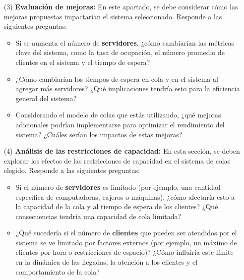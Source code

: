 \documentclass{article}
\begin{document}
\begin{problem}
\begin{itemize}
    \item [(3)] \textbf{Evaluación de mejoras:}
    En este apartado, se debe considerar cómo las mejoras propuestas impactarían el sistema seleccionado. Responde a las siguientes preguntas:
    \begin{itemize}
        \item Si se aumenta el número de \textbf{servidores}, ¿cómo cambiarían las métricas clave del sistema, como la tasa de ocupación, el número promedio de clientes en el sistema y el tiempo de espera?
        \item ¿Cómo cambiarían los tiempos de espera en cola y en el sistema al agregar más servidores? ¿Qué implicaciones tendría esto para la eficiencia general del sistema?
        \item Considerando el modelo de colas que estás utilizando, ¿qué mejoras adicionales podrían implementarse para optimizar el rendimiento del sistema? ¿Cuáles serían los impactos de estas mejoras?
    \end{itemize}
    
    \item [(4)] \textbf{Análisis de las restricciones de capacidad:}
    En esta sección, se deben explorar los efectos de las restricciones de capacidad en el sistema de colas elegido. Responde a las siguientes preguntas:
    \begin{itemize}
        \item Si el número de \textbf{servidores} es limitado (por ejemplo, una cantidad específica de computadoras, cajeros o máquinas), ¿cómo afectaría esto a la capacidad de la cola y al tiempo de espera de los clientes? ¿Qué consecuencias tendría una capacidad de cola limitada?
        \item ¿Qué sucedería si el número de \textbf{clientes} que pueden ser atendidos por el sistema se ve limitado por factores externos (por ejemplo, un máximo de clientes por hora o restricciones de espacio)? ¿Cómo influiría este límite en la dinámica de las llegadas, la atención a los clientes y el comportamiento de la cola?
    \end{itemize}
\end{itemize}
\end{problem}
\end{document}
